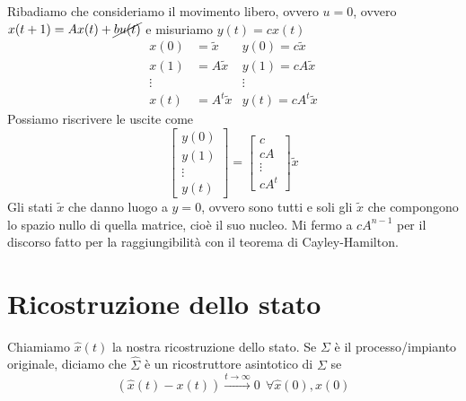 \documentclass[10pt,a4paper]{book}
\begin{document}
Ribadiamo che consideriamo il movimento libero, ovvero $u=0$, ovvero $x(t+1) =Ax(t) +\cancel{bu(t)}$ e misuriamo $y(t) =cx(t)$
\begin{equation*}
	\begin{aligned}
		x(0)   & =\tilde{x}    & y(0) =c\tilde{x}    \\
		x(1)   & =A\tilde{x}   & y(1) =cA\tilde{x}   \\
		\vdots &               & \vdots              \\
		x(t)   & =A^t\tilde{x} & y(t) =cA^t\tilde{x} 
	\end{aligned}
\end{equation*}
Possiamo riscrivere le uscite come
\begin{equation*}
	\begin{bmatrix}
		y(0)   \\
		y(1)   \\
		\vdots \\
		y(t)   
	\end{bmatrix} =\begin{bmatrix}
	c\\
	cA\\
	\vdots \\
	cA^t
	\end{bmatrix}\tilde{x}
\end{equation*}
Gli stati $\tilde{x}$ che danno luogo a $y=0$, ovvero sono tutti e soli gli $\tilde{x}$ che compongono lo spazio nullo di quella matrice, cioè il suo nucleo. Mi fermo a $cA^{n-1}$ per il discorso fatto per la raggiungibilità con il teorema di Cayley-Hamilton.
\section{Ricostruzione dello stato}

Chiamiamo $\hat{x}(t)$ la nostra ricostruzione dello stato. Se $\Sigma $ è il processo/impianto originale, diciamo che $\hat{\Sigma }$ è un ricostruttore asintotico di $\Sigma $ se
\begin{equation*}
	(\hat{x}(t) -x(t))\xrightarrow{t\rightarrow \infty } 0\ \ \forall \hat{x}(0) ,x(0)
\end{equation*}
\end{document}
